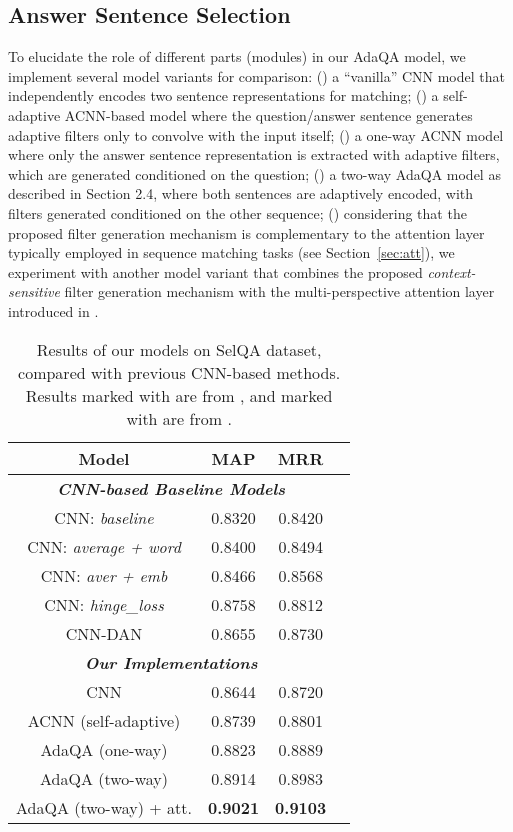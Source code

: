 \documentclass[11pt,a4paper]{article}
\begin{document}
\subsection{Answer Sentence Selection}
\label{sec:exp_qa}
\vspace{-1.5mm}
To elucidate the role of different parts (modules) in our AdaQA model, we implement several model variants for comparison: (\emph{}) a ``vanilla'' CNN model that independently encodes two sentence representations for matching; (\emph{}) a self-adaptive ACNN-based model where the question/answer sentence generates adaptive filters only to convolve with the input itself; (\emph{}) a one-way ACNN model where only the answer sentence representation is extracted with adaptive filters, which are generated conditioned on the question; (\emph{}) a two-way AdaQA model as described in Section 2.4, where both sentences are adaptively encoded, with filters generated conditioned on the other sequence; (\emph{}) considering that the proposed filter generation mechanism is complementary to the attention layer typically employed in sequence matching tasks (see Section~\ref{sec:att}), we experiment with another model variant that combines the proposed \emph{context-sensitive} filter generation mechanism with the multi-perspective attention layer introduced in \cite{wang2017bilateral}. 

\begin{table}
	\centering
	\begin{tabular}{c|c|cc}
		\toprule[1.2pt]
		\textbf{Model} &  \textbf{MAP} &  \textbf{MRR}   \\
		\hline
		\multicolumn{3}{c}{\emph{\textbf{CNN-based Baseline Models}}} \\
		\hline
		CNN: \emph{baseline}     & 0.8320 &  0.8420 \\
		CNN: \emph{average + word}      & 0.8400 & 0.8494 \\
		CNN: \emph{aver + emb}     & 0.8466 & 0.8568 \\
CNN: \emph{hinge\_loss}     & 0.8758 & 0.8812 \\
		CNN-DAN    & 0.8655 & 0.8730 \\
		\hline
		\multicolumn{3}{c}{\emph{\textbf{Our Implementations}}} \\
		\hline
		CNN        & 0.8644 & 0.8720 \\
		ACNN (self-adaptive)         & 0.8739 & 0.8801  \\
		AdaQA (one-way)         & 0.8823 & 0.8889  \\ 
		AdaQA (two-way)       & 0.8914 & 0.8983  \\ 
		AdaQA (two-way) + att. & \textbf{0.9021} & \textbf{0.9103}  \\ 
		\bottomrule[1.2pt]
	\end{tabular}
	\caption{\small Results of our models on SelQA dataset, compared with previous CNN-based methods. Results marked with  are from \cite{jurczyk2016selqa}, and marked with  are from \cite{santos2017learning}.}
	\label{tab:selqa}
	\vspace{-6mm}
\end{table}
\end{document}
